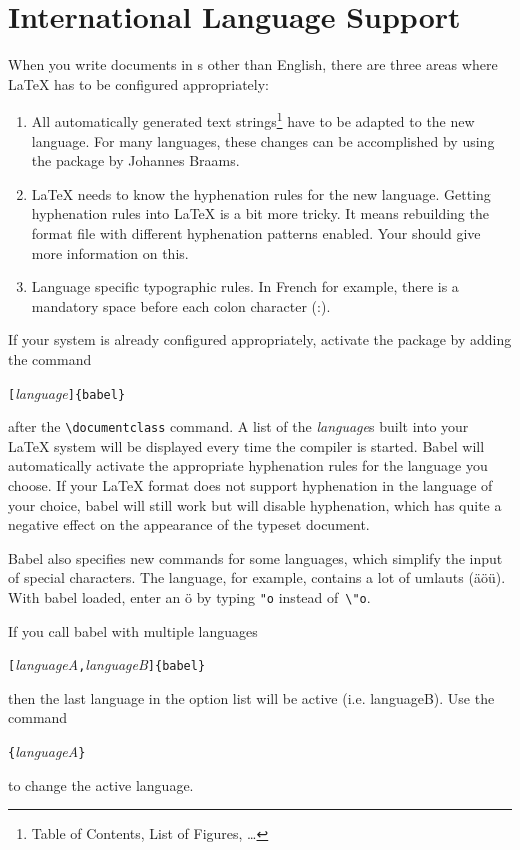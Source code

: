 \section{International Language Support}
 When you write documents in s
other than English, there are three areas where \LaTeX{} has to be
configured appropriately:

\begin{enumerate}
\item All automatically generated text strings\footnote{Table of
    Contents, List of Figures, \ldots} have to be adapted to the new
  language.  For many languages, these changes can be accomplished by
  using the  package by Johannes Braams.
\item \LaTeX{} needs to know the hyphenation rules for the new
  language. Getting hyphenation rules into \LaTeX{} is a bit more
  tricky. It means rebuilding the format file with different
  hyphenation patterns enabled. Your \guide{} should give more
  information on this.
\item Language specific typographic rules. In French for example, there is a
  mandatory space before each colon character (:).
\end{enumerate}

If your system is already configured appropriately, activate
the  package by adding the command
\begin{lscommand}
\verb|[|\emph{language}\verb|]{babel}|
\end{lscommand}
\noindent after the \verb|\documentclass| command. A list of the
\emph{language}s built into your \LaTeX{} system will be displayed
every time the compiler is started. Babel will
automatically activate the appropriate hyphenation rules for the
language you choose. If your \LaTeX{} format does not support
hyphenation in the language of your choice, babel will still work but
will disable hyphenation, which has quite a negative effect on the
appearance of the typeset document.

\textsf{Babel} also specifies new commands for some languages, which
simplify the input of special characters. The  language, for
example, contains a lot of umlauts (\"a\"o\"u).  With \textsf{babel} loaded,
enter an \"o by typing \verb|"o| instead of~\verb|\"o|.

If you call babel with multiple languages
\begin{lscommand}
\verb|[|\emph{languageA}\verb|,|\emph{languageB}\verb|]{babel}| 
\end{lscommand}
\noindent then the last language in the option list will be active (i.e.
languageB). Use the command
\begin{lscommand}
\verb|{|\emph{languageA}\verb|}|
\end{lscommand}
\noindent to change the active language.

